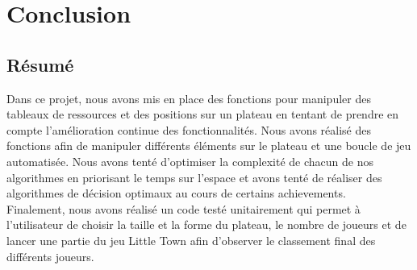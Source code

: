\vspace*{-0.9cm}
\section*{Conclusion}
\subsection*{Résumé}
Dans ce projet, nous avons mis en place des fonctions pour manipuler des tableaux de ressources et des positions sur un plateau en tentant de prendre en compte l'amélioration continue des fonctionnalités.
Nous avons réalisé des fonctions afin de manipuler différents éléments sur le plateau et une boucle de jeu automatisée.
Nous avons tenté d'optimiser la complexité de chacun de nos algorithmes en priorisant le temps sur l'espace et avons tenté de réaliser des algorithmes de décision optimaux au cours de certains achievements.\\
Finalement, nous avons réalisé un code testé unitairement qui permet à l'utilisateur de choisir la taille et la forme du plateau, le nombre de joueurs et de lancer une partie du jeu Little Town afin d'observer le classement final des différents joueurs.

